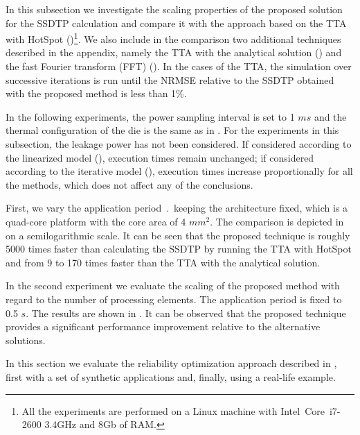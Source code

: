  \label{sec:results-ssdtp}

In this subsection we investigate the scaling properties of the proposed solution for the SSDTP calculation and compare it with the approach based on the TTA with HotSpot ()\footnote{All the experiments are performed on a Linux machine with Intel\textregistered\ Core\texttrademark\ i7-2600 3.4GHz and 8Gb of RAM.}. We also include in the comparison two additional techniques described in the appendix, namely the TTA with the analytical solution () and the fast Fourier transform (FFT) (). In the cases of the TTA, the simulation over successive iterations is run until the NRMSE relative to the SSDTP obtained with the proposed method is less than 1\%.

In the following experiments, the power sampling interval is set to 1 $ms$ and the thermal configuration of the die is the same as in . For the experiments in this subsection, the leakage power has not been considered. If considered according to the linearized model (), execution times remain unchanged; if considered according to the iterative model (), execution times increase proportionally for all the methods, which does not affect any of the conclusions.

First, we vary the application period $\period$ keeping the architecture fixed, which is a quad-core platform with the core area of 4 $mm^2$. The comparison is depicted in  on a semilogarithmic scale. It can be seen that the proposed technique is roughly 5000 times faster than calculating the SSDTP by running the TTA with HotSpot and from 9 to 170 times faster than the TTA with the analytical solution.

In the second experiment we evaluate the scaling of the proposed method with regard to the number of processing elements. The application period is fixed to 0.5 $s$. The results are shown in . It can be observed that the proposed technique provides a significant performance improvement relative to the alternative solutions.

 \label{sec:reliability-results}
In this section we evaluate the reliability optimization approach described in , first with a set of synthetic applications and, finally, using a real-life example.

